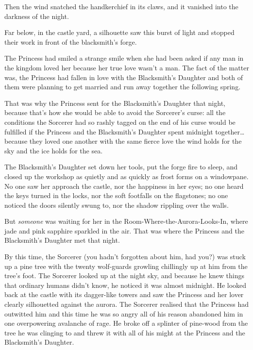 Then the wind snatched the handkerchief in its claws, and it vanished into the darkness of the night. 

Far below, in the castle yard, a silhouette saw this burst of light and stopped their work in front of the blacksmith’s forge. 

The Princess had smiled a strange smile when she had been asked if any man in the kingdom loved her because her true love wasn't a man. The fact of the matter was, the Princess had fallen in love with the Blacksmith's Daughter and both of them were planning to get married and run away together the following spring. 

That was why the Princess sent for the Blacksmith's Daughter that night, because that's how she would be able to avoid the Sorcerer's curse: all the conditions the Sorcerer had so rashly tagged on the end of his curse would be fulfilled if the Princess and the Blacksmith's Daughter spent midnight together… because they loved one another with the same fierce love the wind holds for the sky and the ice holds for the sea. 

The Blacksmith’s Daughter set down her tools, put the forge fire to sleep, and closed up the workshop as quietly and as quickly as frost forms on a windowpane. No one saw her approach the castle, nor the happiness in her eyes; no one heard the keys turned in the locks, nor the soft footfalls on the flagstones; no one noticed the doors silently swung to, nor the shadow rippling over the walls. 

But \emph{someone} was waiting for her in the Room-Where-the-Aurora-Looks-In, where jade and pink sapphire sparkled in the air. That was where the Princess and the Blacksmith’s Daughter met that night.  

By this time, the Sorcerer (you hadn't forgotten about him, had you?) was stuck up a pine tree with the twenty wolf-guards growling chillingly up at him from the tree's foot. The Sorcerer looked up at the night sky, and because he knew things that ordinary humans didn't know, he noticed it was almost midnight. He looked back at the castle with its dagger-like towers and saw the Princess and her lover clearly silhouetted against the aurora. The Sorcerer realised that the Princess had outwitted him and this time he was so angry all of his reason abandoned him in one overpowering avalanche of rage. He broke off a splinter of pine-wood from the tree he was clinging to and threw it with all of his might at the Princess and the Blacksmith's Daughter. 

